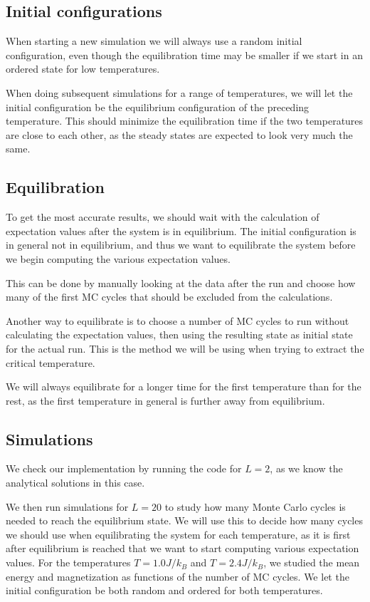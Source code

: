 \documentclass[%
 reprint,
nofootinbib,
aps,
]{revtex4-1}
\begin{document}
\subsection{Initial configurations}

When starting a new simulation we will always use a random initial configuration, even though the equilibration time may be smaller if we start in an ordered state for low temperatures.

When doing subsequent simulations for a range of temperatures, we will let the initial configuration be the equilibrium configuration of the preceding temperature. This should minimize the equilibration time if the two temperatures are close to each other, as the steady states are expected to look very much the same.



\subsection{Equilibration}

To get the most accurate results, we should wait with the calculation of expectation values after the system is in equilibrium. The initial configuration is in general not in equilibrium, and thus we want to equilibrate the system before we begin computing the various expectation values.

This can be done by manually looking at the data after the run and choose how many of the first MC cycles that should be excluded from the calculations. 

Another way to equilibrate is to choose a number of MC cycles to run without calculating the expectation values, then using the resulting state as initial state for the actual run. This is the method we will be using when trying to extract the critical temperature.

We will always equilibrate for a longer time for the first temperature than for the rest, as the first temperature in general is further away from equilibrium.


\subsection{Simulations}

We check our implementation by running the code for $L = 2$, as we know the analytical solutions in this case. 

We then run simulations for $L = 20$ to study how many Monte Carlo cycles is needed to reach the equilibrium state. We will use this to decide how many cycles we should use when equilibrating the system for each temperature, as it is first after equilibrium is reached that we want to start computing various expectation values. For the temperatures $T = 1.0J/k_B$ and $T = 2.4J/k_B$, we studied the mean energy and magnetization as functions of the number of MC cycles. We let the initial configuration be both random and ordered for both temperatures.
\end{document}
